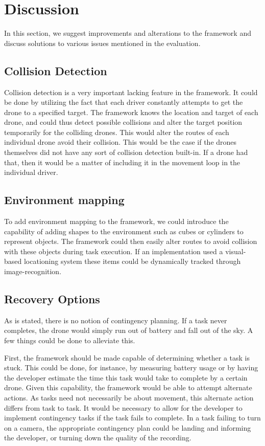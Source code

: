 \section{Discussion}
In this section, we suggest improvements and alterations to the framework and discuss solutions to various issues mentioned in the evaluation.

\subsection{Collision Detection}
Collision detection is a very important lacking feature in the framework. It could be done by utilizing the fact that each driver constantly attempts to get the drone to a specified target. The framework knows the location and target of each drone, and could thus detect possible collisions and alter the target position temporarily for the colliding drones. This would alter the routes of each individual drone avoid their collision. This would be the case if the drones themselves did not have any sort of collision detection built-in. If a drone had that, then it would be a matter of including it in the movement loop in the individual driver.

\subsection{Environment mapping}
To add environment mapping to the framework, we could introduce the capability of adding shapes to the environment such as cubes or cylinders to represent objects. The framework could then easily alter routes to avoid collision with these objects during task execution. If an implementation used a visual-based locationing system these items could be dynamically tracked through image-recognition.

\subsection{Recovery Options}
As is stated, there is no notion of contingency planning. If a task never completes, the drone would simply run out of battery and fall out of the sky. A few things could be done to alleviate this.

First, the framework should be made capable of determining whether a task is stuck. This could be done, for instance, by measuring battery usage or by having the developer estimate the time this task would take to complete by a certain drone. Given this capability, the framework would be able to attempt alternate actions. As tasks need not necessarily be about movement, this alternate action differs from task to task. It would be necessary to allow for the developer to implement contingency tasks if the task fails to complete. In a task failing to turn on a camera, the appropriate contingency plan could be landing and informing the developer, or turning down the quality of the recording.

